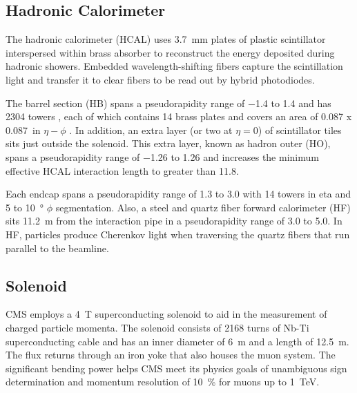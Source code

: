 \documentclass[12pt]{article}
\begin{document}
    \subsection{Hadronic Calorimeter}
        The hadronic calorimeter (HCAL) uses \SI{3.7}{mm} plates of plastic scintillator interspersed within brass absorber to reconstruct the energy deposited during hadronic showers. Embedded wavelength-shifting fibers capture the scintillation light and transfer it to clear fibers to be read out by hybrid photodiodes\cite{cms_experiment, cms_tdr}.

        The barrel section (HB) spans a pseudorapidity range of \num{-1.4} to \num{1.4} and has \num{2304} towers , each of which contains \num{14}  brass plates and covers an area of \num{0.087} x \SI{0.087}{in} $\eta-\phi$ . In addition, an extra layer (or two at $\eta = \num{0}$) of scintillator tiles sits just outside the solenoid. This extra layer, known as hadron outer (HO), spans a pseudorapidity range of \num{-1.26} to \num{1.26} and increases the minimum effective HCAL interaction length to greater than \num{11.8}.

        Each endcap spans a pseudorapidity range of \num{1.3} to \num{3.0} with \num{14} towers in eta and \num{5} to \SI{10}{\degree} $\phi$ segmentation. Also, a steel and quartz fiber forward calorimeter (HF) sits \SI{11.2}{m} from the interaction pipe in a pseudorapidity range of \num{3.0} to \num{5.0}. In HF, particles produce Cherenkov light when traversing the quartz fibers that run parallel to the beamline. 

    \subsection{Solenoid}
        CMS employs a \SI{4}{T} superconducting solenoid to aid in the measurement of charged particle momenta. The solenoid consists of \num{2168} turns of Nb-Ti superconducting cable and has an inner diameter of \SI{6}{m} and a length of \SI{12.5}{m}. The flux returns through an iron yoke that also houses the muon system. The significant  bending power helps CMS meet its physics goals of unambiguous sign determination and momentum resolution of \SI{10}{\percent} for muons up to \SI{1}{\tera\electronvolt}\cite{cms_experiment}.
\end{document}

